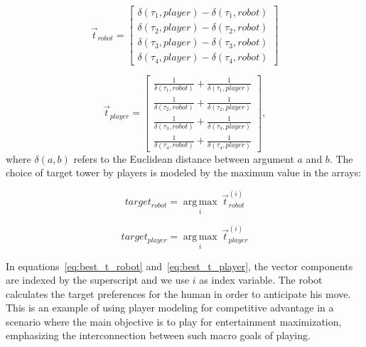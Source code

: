\begin{equation}
    \overrightarrow{t}_{robot} = \begin{bmatrix}
    \delta(\tau_{1},player) -\delta(\tau_{1},robot)  \\ 
    \delta(\tau_{2},player) - \delta(\tau_{2},robot)  \\
    \delta(\tau_{3},player) - \delta(\tau_{3},robot) \\
    \delta(\tau_{4},player) - \delta(\tau_{4},robot)
    \end{bmatrix}
    \label{eq:array1}
\end{equation}

\begin{equation}
\overrightarrow{t}_{player} = \begin{bmatrix}
\frac{1}{\delta(\tau_{1},robot)} + \frac{1}{\delta(\tau_{1},player)} \\ 
\frac{1}{\delta(\tau_{2},robot)} + \frac{1}{\delta(\tau_{2},player)}  \\
\frac{1}{\delta(\tau_{3},robot)} + \frac{1}{\delta(\tau_{3},player)}  \\
\frac{1}{\delta(\tau_{4},robot)} + \frac{1}{\delta(\tau_{4},player)} 
\end{bmatrix},
\label{eq:array2}
\end{equation}
where $\delta(a,b)$ refers to the Euclidean distance between argument $a$ and $b$. The choice of target tower by players is modeled by the maximum value in the arrays:

\begin{equation} \label{eq:best_t_robot}
    target_{robot} = \operatorname*{arg\,max}_i \, \overrightarrow{t}^{(i)}_{robot} 
\end{equation}

\begin{equation} \label{eq:best_t_player}
target_{player} = \operatorname*{arg\,max}_i \, \overrightarrow{t}^{(i)}_{player}
\end{equation}

In equations~\ref{eq:best_t_robot} and~\ref{eq:best_t_player}, the vector components are indexed by the superscript and we use $i$ as index variable. The robot calculates the target preferences for the human in order to anticipate his move. This is an example of using player modeling for competitive advantage in a scenario where the main objective is to play for entertainment maximization, emphasizing the interconnection between such macro goals of playing.

